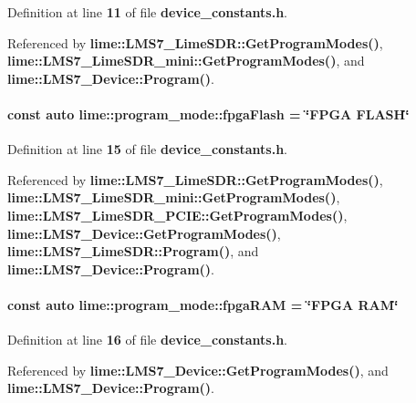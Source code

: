 Definition at line {\bf 11} of file {\bf device\+\_\+constants.\+h}.



Referenced by {\bf lime\+::\+L\+M\+S7\+\_\+\+Lime\+S\+D\+R\+::\+Get\+Program\+Modes()}, {\bf lime\+::\+L\+M\+S7\+\_\+\+Lime\+S\+D\+R\+\_\+mini\+::\+Get\+Program\+Modes()}, and {\bf lime\+::\+L\+M\+S7\+\_\+\+Device\+::\+Program()}.

\paragraph[{fpga\+Flash}]{\setlength{\rightskip}{0pt plus 5cm}const auto lime\+::program\+\_\+mode\+::fpga\+Flash = \char`\"{}F\+P\+GA F\+L\+A\+SH\char`\"{}}\label{namespacelime_1_1program__mode_a3678af75481135f90045dbf299de5b56}


Definition at line {\bf 15} of file {\bf device\+\_\+constants.\+h}.



Referenced by {\bf lime\+::\+L\+M\+S7\+\_\+\+Lime\+S\+D\+R\+::\+Get\+Program\+Modes()}, {\bf lime\+::\+L\+M\+S7\+\_\+\+Lime\+S\+D\+R\+\_\+mini\+::\+Get\+Program\+Modes()}, {\bf lime\+::\+L\+M\+S7\+\_\+\+Lime\+S\+D\+R\+\_\+\+P\+C\+I\+E\+::\+Get\+Program\+Modes()}, {\bf lime\+::\+L\+M\+S7\+\_\+\+Device\+::\+Get\+Program\+Modes()}, {\bf lime\+::\+L\+M\+S7\+\_\+\+Lime\+S\+D\+R\+::\+Program()}, and {\bf lime\+::\+L\+M\+S7\+\_\+\+Device\+::\+Program()}.

\paragraph[{fpga\+R\+AM}]{\setlength{\rightskip}{0pt plus 5cm}const auto lime\+::program\+\_\+mode\+::fpga\+R\+AM = \char`\"{}F\+P\+GA {\bf R\+AM}\char`\"{}}\label{namespacelime_1_1program__mode_a9adf521b699a7630a76e8822f643168e}


Definition at line {\bf 16} of file {\bf device\+\_\+constants.\+h}.



Referenced by {\bf lime\+::\+L\+M\+S7\+\_\+\+Device\+::\+Get\+Program\+Modes()}, and {\bf lime\+::\+L\+M\+S7\+\_\+\+Device\+::\+Program()}.

